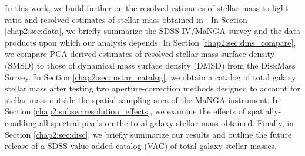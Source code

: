 In this work, we build further on the resolved estimates of stellar mass-to-light ratio and resolved estimates of stellar mass obtained in : In Section \ref{chap2:sec:data}, we briefly summarize the SDSS-IV/MaNGA survey and the data products upon which our analysis depends. In Section \ref{chap2:sec:dms_compare}, we compare PCA-derived estimates of resolved stellar mass surface-density (SMSD) to those of dynamical mass surface density (DMSD) from the DiskMass Survey. In Section \ref{chap2:sec:mstar_catalog}, we obtain a catalog of total galaxy stellar mass after testing two aperture-correction methods designed to account for stellar mass outside the spatial sampling area of the MaNGA instrument. In Section \ref{chap2:subsec:resolution_effects}, we examine the effects of spatially-coadding all spectral pixels on the total galaxy stellar mass obtained. Finally, in Section \ref{chap2:sec:disc}, we briefly summarize our results and outline the future release of a SDSS value-added catalog (VAC) of total galaxy stellar-masses.